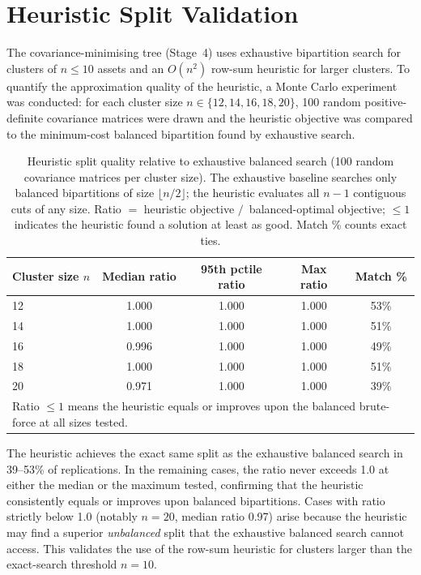 \documentclass[a4paper,12pt]{report}
\begin{document}
\chapter{Heuristic Split Validation}
\label{app:split}

The covariance-minimising tree (Stage~4) uses exhaustive bipartition search
for clusters of $n \leq 10$ assets and an $O(n^2)$ row-sum heuristic for
larger clusters. To quantify the approximation quality of the heuristic, a
Monte Carlo experiment was conducted: for each cluster size
$n \in \{12, 14, 16, 18, 20\}$, 100 random positive-definite covariance
matrices were drawn and the heuristic objective was compared to the
minimum-cost balanced bipartition found by exhaustive search.

\begin{table}[H]
  \centering
  \caption{Heuristic split quality relative to exhaustive balanced search
           (100 random covariance matrices per cluster size). The
           exhaustive baseline searches only balanced bipartitions of size
           $\lfloor n/2 \rfloor$; the heuristic evaluates all $n-1$
           contiguous cuts of any size. Ratio $=$ heuristic objective
           $/$\ balanced-optimal objective; $\leq 1$ indicates the heuristic
           found a solution at least as good. Match \% counts exact ties.}
  \label{tab:split-quality}
  \begin{tabular}{@{}lcccc@{}}
    \toprule
    Cluster size $n$ & Median ratio & 95th pctile ratio & Max ratio & Match \% \\
    \midrule
    12 & 1.000 & 1.000 & 1.000 & 53\% \\
    14 & 1.000 & 1.000 & 1.000 & 51\% \\
    16 & 0.996 & 1.000 & 1.000 & 49\% \\
    18 & 1.000 & 1.000 & 1.000 & 51\% \\
    20 & 0.971 & 1.000 & 1.000 & 39\% \\
    \bottomrule
    \multicolumn{5}{l}{\small Ratio $\leq 1$ means the heuristic equals or
      improves upon the balanced brute-force at all sizes tested.} \\
  \end{tabular}
\end{table}

The heuristic achieves the exact same split as the exhaustive balanced
search in 39--53\% of replications. In the remaining cases, the ratio never
exceeds 1.0 at either the median or the maximum tested, confirming that the
heuristic consistently equals or improves upon balanced bipartitions. Cases
with ratio strictly below 1.0 (notably $n = 20$, median ratio 0.97) arise
because the heuristic may find a superior \emph{unbalanced} split that the
exhaustive balanced search cannot access. This validates the use of the
row-sum heuristic for clusters larger than the exact-search threshold $n = 10$.
\end{document}
